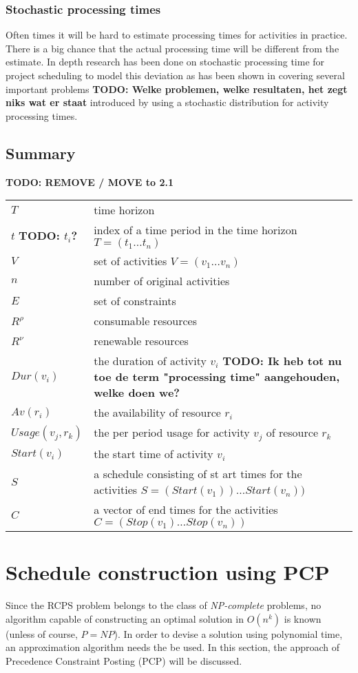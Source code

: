 \documentclass{article}
\newcommand{\TODO}[1]{{\color{red}\textbf{TODO: #1}}}
\newcommand{\renres}[0]{R^\rho} %
\newcommand{\conres}[0]{R^\nu} %
\newcommand{\av}[1]{\textit{Av}(#1)} %
\newcommand{\dur}[1]{\textit{Dur}(#1)} %
\newcommand{\usage}[1]{\textit{Usage}(#1)} %
\newcommand{\start}[1]{\textit{Start}(#1)} %
\begin{document}
\subsubsection{Stochastic processing times}
Often times it will be hard to estimate processing times for activities in practice.
There is a big chance that the actual processing time will be  different from the estimate.
In depth research has been done on stochastic processing time for project scheduling to model this deviation as has been shown in \cite{brucker99} covering several important problems \TODO{Welke problemen, welke resultaten, het zegt niks wat er staat} introduced by using a stochastic distribution for activity processing times.

\subsection{Summary}
\TODO{REMOVE / MOVE to 2.1}
\begin{tabular}{l l}
\hline
$T$ & time horizon \\
$t$ \TODO{$t_i$?} &  index of a time period in the time horizon $T = (t_1 \ldots t_n)$\\
$V$ & set of activities $V = (v_1 \ldots v_n)$ \\
$n$ & number of original activities \\
$E$ & set of constraints \\
$\renres$ & consumable resources \\
$\conres$ & renewable resources \\
$\dur{v_i}$ & the duration of activity $v_i$ \TODO{Ik heb tot nu toe de term "processing time" aangehouden, welke doen we?}\\
$\av{r_i}$ & the availability of resource $r_i$ \\
$\usage{v_j, r_k}$ & the per period usage for activity $v_j$ of resource $r_k$ \\
$\start{v_i}$ & the start time of activity $v_i$ \\
$S$ & a schedule consisting of st
art times for the activities $S = (\start{v_1}) \ldots \start{v_n})$ \\
$C$ & a vector of end times for the activities $C = (Stop(v_1) \ldots Stop(v_n))$ \\
\hline
\end{tabular}

\newpage

\section{Schedule construction using PCP}
Since the RCPS problem belongs to the class of \emph{NP-complete} problems, no algorithm capable of constructing an optimal solution in $O(n^k)$ is known (unless of course, $P=NP$). In order to devise a solution using polynomial time, an approximation algorithm needs the be used. In this section, the approach of Precedence Constraint Posting (PCP) will be discussed.
\end{document}
